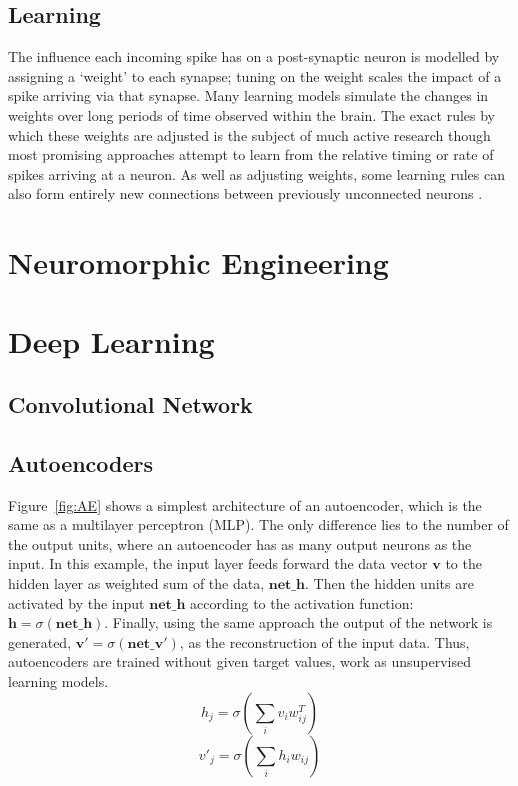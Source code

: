 \subsection{Learning}
The influence each incoming spike has on a post-synaptic neuron is modelled by assigning a `weight' to each synapse;
tuning on the weight scales the impact of a spike
arriving via that synapse.
Many learning models simulate the changes in weights over long periods of time observed within the brain.
The exact rules by which these weights are adjusted is the subject of much active research though most promising approaches attempt to learn from the relative timing \cite{pfister2006triplets} or rate \cite{bienenstock1982theory} of spikes arriving at a neuron.
As well as adjusting weights, some learning rules can also form entirely new connections between previously unconnected
neurons \cite{bamford2010synaptic}.

\section{Neuromorphic Engineering}
\label{sec:morph}

\section{Deep Learning}
\subsection{Convolutional Network}
\subsection{Autoencoders}
\label{sec:AE}
Figure~\ref{fig:AE} shows a simplest architecture of an autoencoder, which is the same as a multilayer perceptron (MLP).
The only difference lies to the number of the output units, where an autoencoder has as many output neurons as the input.
In this example, the input layer feeds forward the data vector $\mathbf{v}$ to the hidden layer as weighted sum of the data, $\mathbf{net\_h}$.
Then the hidden units are activated by the input $\mathbf{net\_h}$ according to the activation function: $\mathbf{h}=\sigma(\mathbf{net\_h})$.
Finally, using the same approach the output of the network is generated, $\mathbf{v'}=\sigma(\mathbf{net\_v'})$, as the reconstruction of the input data.
Thus, autoencoders are trained without given target values, work as unsupervised learning models.
\begin{equation}
h_j=\sigma(\sum_i v_i w^T_{ij})
\end{equation}
\begin{equation}
v'_j=\sigma(\sum_i h_i w_{ij})
\end{equation}

